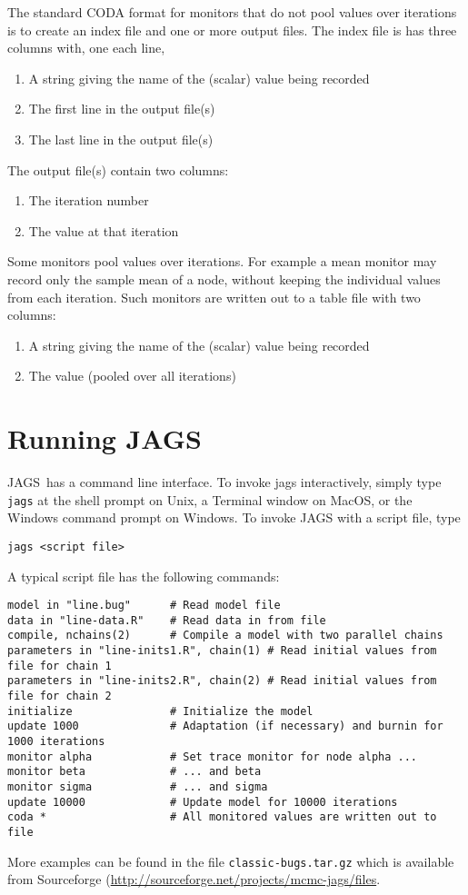 \documentclass[11pt, a4paper, titlepage]{report}
\newcommand{\JAGS}{\textsf{JAGS}}
\begin{document}
The standard CODA format for monitors that do not pool values over
iterations is to create an index file and one or more output files.
The index file is has three columns with, one each line,
\begin{enumerate}
\item A string giving the name of the (scalar) value being recorded
\item The first line in the output file(s)
\item The last line in the output file(s)
\end{enumerate}
The output file(s) contain two columns:
\begin{enumerate}
\item The iteration number
\item The value at that iteration
\end{enumerate}

Some monitors pool values over iterations. For example a mean monitor
may record only the sample mean of a node, without keeping the
individual values from each iteration. Such monitors are written out
to a table file with two columns:
\begin{enumerate}
\item A string giving the name of the (scalar) value being recorded
\item The value (pooled over all iterations)
\end{enumerate}

\chapter{Running \JAGS}

\JAGS\ has a command line interface. To invoke jags interactively,
simply type \texttt{jags} at the shell prompt on Unix, a Terminal window on MacOS, or the Windows
command prompt on Windows. To invoke JAGS with a script file, type
\begin{verbatim}
jags <script file>
\end{verbatim}
A typical script file has the following commands: 
\begin{verbatim}
model in "line.bug"      # Read model file
data in "line-data.R"    # Read data in from file
compile, nchains(2)      # Compile a model with two parallel chains
parameters in "line-inits1.R", chain(1) # Read initial values from file for chain 1
parameters in "line-inits2.R", chain(2) # Read initial values from file for chain 2
initialize               # Initialize the model
update 1000              # Adaptation (if necessary) and burnin for 1000 iterations
monitor alpha            # Set trace monitor for node alpha ...
monitor beta             # ... and beta
monitor sigma            # ... and sigma
update 10000             # Update model for 10000 iterations
coda *                   # All monitored values are written out to file
\end{verbatim}
More examples can be found in the file \verb+classic-bugs.tar.gz+
which is available from Sourceforge
(\url{http://sourceforge.net/projects/mcmc-jags/files}.
\end{document}
